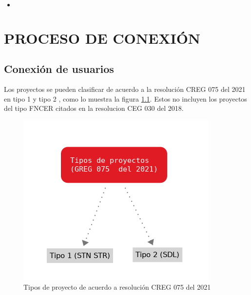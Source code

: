 \documentclass[a5paper]{book}%
\begin{document}
  \begin{itemize}
    
  \item 

 \end{itemize}

\begin{itemize}

\end{itemize}
  
\chapter{PROCESO DE CONEXIÓN}

\section{Conexión de usuarios}

Los proyectos se pueden clasificar de acuerdo a la resolución CREG 075
del 2021 en tipo 1 y tipo 2 , como lo muestra la figura
\ref{fig:tipoproyecto}. Estos no incluyen los proyectos del tipo
\ac{FNCER} citados en la resolucion CEG 030 del 2018.


\begin{figure}[H]
  \centering \includegraphics[width=1\linewidth]{tipoproyecto}
  \caption{Tipos de proyecto de acuerdo a resolución CREG 075 del
    2021}
  \label{fig:tipoproyecto}
\end{figure}
\end{document}

